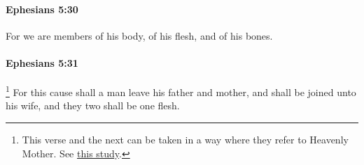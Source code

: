 		\paragraph{Ephesians 5:30} %
			\label{EPHESIANS-5-30}

			For we are members of his body, of his flesh, and of his bones.

			\begin{framed}
			\scriptsize
				\begin{compactdesc}
					\item[SBLG] 
				\end{compactdesc}
			\end{framed}

		\paragraph{Ephesians 5:31} %
			\label{EPHESIANS-5-31}

				\footnote{%
					This verse and the next can be taken in a way where they refer to Heavenly Mother. See \hyperref[HEAVENLYMOTHER-verses]{this study}.
					}%
			For this cause shall a man leave his father and mother, and shall be joined unto his wife, and they two shall be one flesh.

